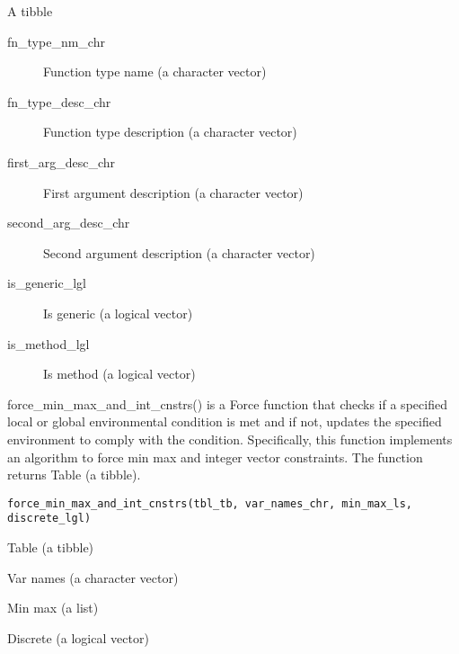 \documentclass[a4paper]{book}
\begin{document}
\begin{Details}\relax
A tibble

\begin{description}

\item[fn\_type\_nm\_chr] Function type name (a character vector)
\item[fn\_type\_desc\_chr] Function type description (a character vector)
\item[first\_arg\_desc\_chr] First argument description (a character vector)
\item[second\_arg\_desc\_chr] Second argument description (a character vector)
\item[is\_generic\_lgl] Is generic (a logical vector)
\item[is\_method\_lgl] Is method (a logical vector)

\end{description}

\end{Details}
%
\begin{Description}\relax
force\_min\_max\_and\_int\_cnstrs() is a Force function that checks if a specified local or global environmental condition is met and if not, updates the specified environment to comply with the condition. Specifically, this function implements an algorithm to force min max and integer vector constraints. The function returns Table (a tibble).
\end{Description}
%
\begin{Usage}
\begin{verbatim}
force_min_max_and_int_cnstrs(tbl_tb, var_names_chr, min_max_ls, discrete_lgl)
\end{verbatim}
\end{Usage}
%
\begin{Arguments}
\begin{ldescription}
\item[\code{tbl\_tb}] Table (a tibble)

\item[\code{var\_names\_chr}] Var names (a character vector)

\item[\code{min\_max\_ls}] Min max (a list)

\item[\code{discrete\_lgl}] Discrete (a logical vector)
\end{ldescription}
\end{Arguments}
\end{document}
